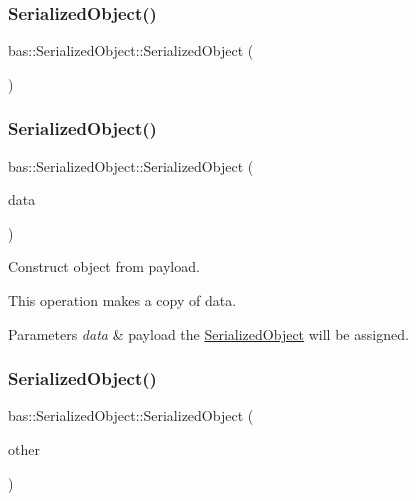 \subsubsection{\texorpdfstring{SerializedObject()}{SerializedObject()}\hspace{0.1cm}{\footnotesize\ttfamily [1/3]}}
{\footnotesize\ttfamily bas\+::\+Serialized\+Object\+::\+Serialized\+Object (\begin{DoxyParamCaption}{ }\end{DoxyParamCaption})\hspace{0.3cm}{\ttfamily [inline]}}

\mbox{\label{classbas_1_1SerializedObject_aab03d4343a574ba80590a453ee403f40}} 
\subsubsection{\texorpdfstring{SerializedObject()}{SerializedObject()}\hspace{0.1cm}{\footnotesize\ttfamily [2/3]}}
{\footnotesize\ttfamily bas\+::\+Serialized\+Object\+::\+Serialized\+Object (\begin{DoxyParamCaption}\item[{const char $\ast$}]{data }\end{DoxyParamCaption})\hspace{0.3cm}{\ttfamily [inline]}}



Construct object from payload. 

This operation makes a copy of data. 
\begin{DoxyParams}{Parameters}
{\em data} & payload the \mbox{\hyperlink{classbas_1_1SerializedObject}{Serialized\+Object}} will be assigned. \\
\hline
\end{DoxyParams}
\mbox{\label{classbas_1_1SerializedObject_a9cd54ce67847bd339b01409ff32e0305}} 
\subsubsection{\texorpdfstring{SerializedObject()}{SerializedObject()}\hspace{0.1cm}{\footnotesize\ttfamily [3/3]}}
{\footnotesize\ttfamily bas\+::\+Serialized\+Object\+::\+Serialized\+Object (\begin{DoxyParamCaption}\item[{const \mbox{\hyperlink{classbas_1_1SerializedObject}{Serialized\+Object}} \&}]{other }\end{DoxyParamCaption})\hspace{0.3cm}{\ttfamily [inline]}}



